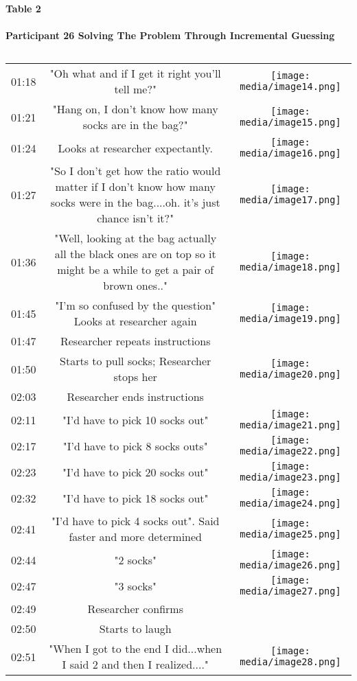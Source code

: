 \documentclass{article}
\begin{document}
\textbf{Table 2}

\paragraph{Participant 26 Solving The Problem Through Incremental Guessing }


\begin{table}

  
\begin{tabular}{c  c  c}

  01:18 & "Oh what and if I get it right you'll tell me?" & \caption{}
\label{}
\texttt{[image: media/image14.png]}
\\
01:21 & "Hang on, I don't know how many socks are in the bag?" & \caption{}
\label{}
\texttt{[image: media/image15.png]}
\\
01:24 & Looks at researcher expectantly. & \caption{}
\label{}
\texttt{[image: media/image16.png]}
\\
01:27 & "So I don't get how the ratio would matter if I don't know how many socks were in the bag....oh. it's just chance isn't it?" & \caption{}
\label{}
\texttt{[image: media/image17.png]}
\\
01:36 & "Well, looking at the bag actually all the black ones are on top so it might be a while to get a pair of brown ones.." & \caption{}
\label{}
\texttt{[image: media/image18.png]}
\\
01:45 & "I'm so confused by the question" Looks at researcher again & \caption{}
\label{}
\texttt{[image: media/image19.png]}
\\
01:47 & Researcher repeats instructions\\
01:50 & Starts to pull socks; Researcher stops her & \caption{}
\label{}
\texttt{[image: media/image20.png]}
\\
02:03 & Researcher ends instructions\\
02:11 & "I'd have to pick 10 socks out" & \caption{}
\label{}
\texttt{[image: media/image21.png]}
\\
02:17 & "I'd have to pick 8 socks outs" & \caption{}
\label{}
\texttt{[image: media/image22.png]}
\\
02:23 & "I'd have to pick 20 socks out" & \caption{}
\label{}
\texttt{[image: media/image23.png]}
\\
02:32 & "I'd have to pick 18 socks out" & \caption{}
\label{}
\texttt{[image: media/image24.png]}
\\
02:41 & "I'd have to pick 4 socks out". Said faster and more determined & \caption{}
\label{}
\texttt{[image: media/image25.png]}
\\
02:44 & "2 socks" & \caption{}
\label{}
\texttt{[image: media/image26.png]}
\\
02:47 & "3 socks" & \caption{}
\label{}
\texttt{[image: media/image27.png]}
\\
02:49 & Researcher confirms\\
02:50 & Starts to laugh\\
02:51 & "When I got to the end I did...when I said 2 and then I realized...." & \caption{}
\label{}
\texttt{[image: media/image28.png]}
\\



\end{tabular}
\end{table}
\end{document}
